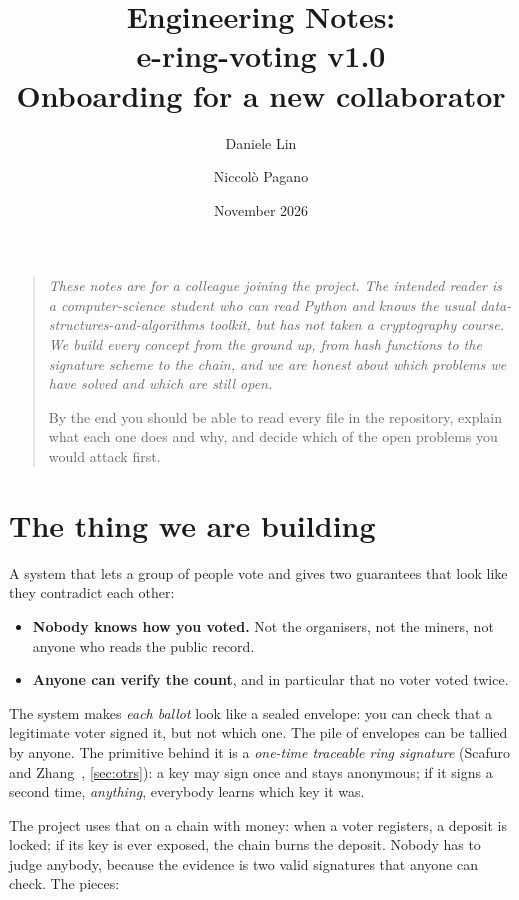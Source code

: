 \documentclass[11pt,a4paper]{article}
\title{\textbf{Engineering Notes:\\ e-ring-voting v1.0}\\[0.4em]
       \large Onboarding for a new collaborator}
\author{Daniele Lin \and Niccol\`o Pagano}
\date{November 2026}
\theoremstyle{definition}
\begin{document}
\maketitle

\begin{quote}
\itshape
These notes are for a colleague joining the project. The intended reader
is a computer-science student who can read Python and knows the usual
data-structures-and-algorithms toolkit, but has not taken a cryptography
course. We build every concept from the ground up, from hash functions to
the signature scheme to the chain, and we are honest about which problems
we have solved and which are still open.

By the end you should be able to read every file in the repository,
explain what each one does and why, and decide which of the open problems
you would attack first.
\end{quote}

\tableofcontents
\clearpage

\section{The thing we are building}

A system that lets a group of people vote and gives two guarantees that
look like they contradict each other:

\begin{itemize}[leftmargin=*]
  \item \textbf{Nobody knows how you voted.} Not the organisers, not the
    miners, not anyone who reads the public record.
  \item \textbf{Anyone can verify the count}, and in particular that no
    voter voted twice.
\end{itemize}

\noindent
The system makes \emph{each ballot} look like a sealed envelope: you can
check that a legitimate voter signed it, but not which one. The pile of
envelopes can be tallied by anyone. The primitive behind it is a
\emph{one-time traceable ring signature} (Scafuro and Zhang~\cite{SZ21},
\cref{sec:otrs}): a key may sign once and stays anonymous; if it signs a
second time, \emph{anything}, everybody learns which key it was.

The project uses that on a chain with money: when a voter registers, a
deposit is locked; if its key is ever exposed, the chain burns the
deposit. Nobody has to judge anybody, because the evidence is two valid
signatures that anyone can check. The pieces:
\end{document}
